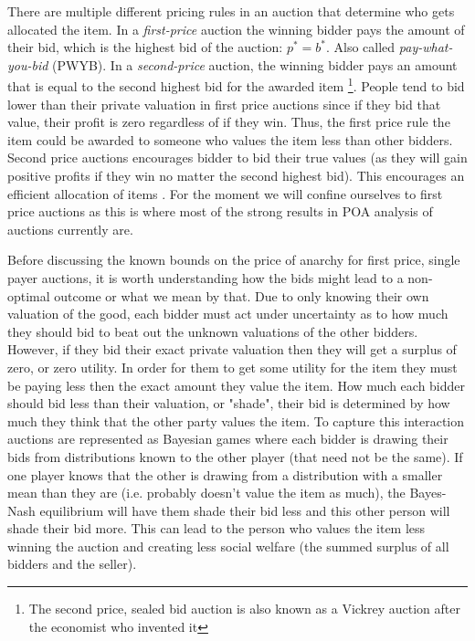 \documentclass[12pt,twoside]{reedthesis}
\begin{document}
There are multiple different pricing rules in an auction that determine who gets allocated the item. In a \textit{first-price} auction the winning bidder pays the amount of their bid, which is the highest bid of the auction: $p^* = b^*$. Also called \textit{pay-what-you-bid} (PWYB). In a \textit{second-price} auction, the winning bidder pays an amount that is equal to the second highest bid for the awarded item \cite{Vickrey1961} \footnote{The second price, sealed bid auction is also known as a Vickrey auction after the economist who invented it}. People tend to bid lower than their private valuation in first price auctions since if they bid that value, their profit is zero regardless of if they win. Thus, the first price rule the item could be awarded to someone who values the item less than other bidders. Second price auctions encourages bidder to bid their true values (as they will gain positive profits if they win no matter the second highest bid). This encourages an efficient allocation of items \citep{Mochon2015}. For the moment we will confine ourselves to first price auctions as this is where most of the strong results in POA analysis of auctions currently are.

Before discussing the known bounds on the price of anarchy for first price, single payer auctions, it is worth understanding how the bids might lead to a non-optimal outcome or what we mean by that. Due to only knowing their own valuation of the good, each bidder must act under uncertainty as to how much they should bid to beat out the unknown valuations of the other bidders. However, if they bid their exact private valuation then they will get a surplus of zero, or zero utility. In order for them to get some utility for the item they must be paying less then the exact amount they value the item. How much each bidder should bid less than their valuation, or "shade", their bid is determined by how much they think that the other party values the item. To capture this interaction auctions are represented as Bayesian games where each bidder is drawing their bids from distributions known to the other player (that need not be the same). If one player knows that the other is drawing from a distribution with a smaller mean than they are (i.e. probably doesn't value the item as much), the Bayes-Nash equilibrium will have them shade their bid less and this other person will shade their bid more. This can lead to the person who values the item less winning the auction and creating less social welfare (the summed surplus of all bidders and the seller). 
\end{document}
